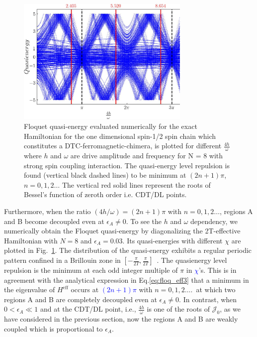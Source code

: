 \documentclass[%
nofootinbib,
reprint,
superscriptaddress,
amsmath,amssymb,showkeys,
aps,
prb,
]{revtex4-2}
\newcommand{\blue}[1]{\textcolor{blue}{#1}}
\begin{document}
	\begin{figure}
		\centering
		\includegraphics[width=8.3cm]{quasienergy_8_lores.jpeg}	
		\caption{Floquet quasi-energy evaluated numerically for the exact Hamiltonian for the one dimensional spin-1/2 spin chain which constitutes a DTC-ferromagnetic-chimera, is plotted for different $\frac{4h}{\omega}$ where $h$ and $\omega$ are drive amplitude and frequency for N = 8 with strong spin coupling interaction. The quasi-energy level repulsion is found (vertical black dashed lines) to be minimum at $(2n+1)\pi$, $n=0,1,2\dots$ The vertical red solid lines represent the roots of Bessel's function of zeroth order i.e. CDT/DL points.}
		\label{Fig:quasienergy}
	\end{figure}
	
	Furthermore, when the ratio $({4h}/{\omega}) = (2n+1)\pi$ with $n = 0,1,2\dots$, regions A and B become decoupled even at $\epsilon_A \neq 0$. To see the $h$ and $\omega$ dependency, we numerically obtain the Floquet quasi-energy by diagonalizing the 2T-effective Hamiltonian with $N=8$ and $\epsilon_A=0.03$. Its quasi-energies with different  $\chi$ are plotted in Fig.~\ref{Fig:quasienergy}. The distribution of the quasi-energy exhibits a regular periodic pattern confined in a Brillouin zone in $[-\frac{\pi}{2T}, \frac{\pi}{2T}]$~\cite{dutta2014}. The quasienergy level repulsion is the minimum at each odd integer multiple of $\pi$ in  \blue{$\chi$}'s. This is in agreement with the analytical expression in Eq.\eqref{eq:floq_eff3} that a minimum in the eigenvalue of $H^{\mathrm{eff}}$ occurs at \blue{$(2n+1)\pi$} with $n=0,1,2\dots$.\, at which two regions A and B are completely decoupled even at $\epsilon_A \neq 0$. In contrast, when $0 < \epsilon_A \ll 1 $ and at the CDT/DL point, i.e., $\frac{4h}{\omega}$ is one of the roots of $\mathcal{J}_0$, as we have considered in the previous section, now the regions A and B are weakly coupled which is proportional to $\epsilon_A$. 	
	
\end{document}
